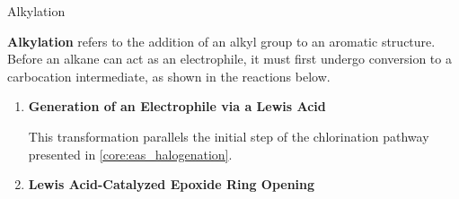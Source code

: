       \begin{core}[label=core:alkylation]{Alkylation}

        \textbf{Alkylation} refers to the addition of an alkyl group to an aromatic structure. Before an alkane can act as an electrophile, it must first undergo conversion to a carbocation intermediate, as shown in the reactions below.

        \begin{enumerate}

          \item \textbf{Generation of an Electrophile via a Lewis Acid}


          This transformation parallels the initial step of the chlorination pathway presented in \autoref{core:eas_halogenation}.

          \item \textbf{Lewis Acid-Catalyzed Epoxide Ring Opening}


\end{enumerate}
\end{core}
